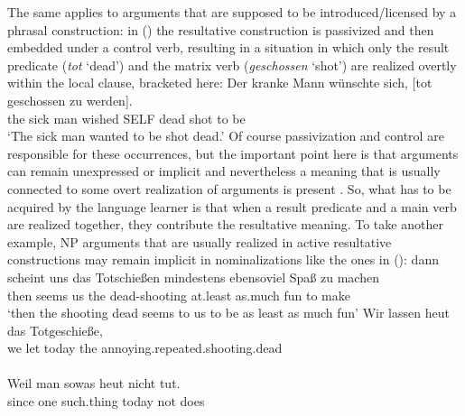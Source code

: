 \begin{exe}
\begin{xlist}[iv.]
\begin{exe}
\begin{xlist}[iv.]
The same applies to arguments that are supposed to be introduced/licensed by a phras\-al construction:
in () the resultative construction is passivized and then embedded under a control
verb, resulting in a situation in which only the result predicate (\emph{tot} `dead') and the matrix verb (\emph{geschossen} `shot') are
realized overtly within the local clause, bracketed here:
\ea
\gll Der kranke Mann wünschte sich, [tot geschossen zu werden].\footnotemark\\
     the sick   man  wished   SELF  \spacebr{}dead shot      to be\\
\glt `The sick man wanted to be shot dead.'
\z
Of course passivization and control are responsible for these occurrences, but the important point
here is that arguments can remain unexpressed or implicit and nevertheless a meaning that is usually
connected to some overt realization of arguments is present \citep[Section~4]{Mueller2007d}. So,
what has to be acquired by the language learner is that when a result predicate and a main verb are
realized together, they contribute the resultative meaning.  
To take another example, NP arguments that are usually realized in active resultative constructions may remain implicit
in nominalizations like the ones in ():
\eal
\label{ex-tot-schiessen}
\ex 
\gll dann scheint uns das Totschießen mindestens ebensoviel Spaß zu machen\footnotemark\\
     then seems   us  the dead-shooting at.least as.much    fun to make\\
\glt `then the shooting dead seems to us to be as least as much fun'
\ex
\gll Wir lassen heut das Totgeschieße,\\                   
we  let    today the annoying.repeated.shooting.dead\\\\
\gll  Weil  man sowas heut nicht tut.\\
      since one such.thing today not does\\\\

\end{xlist}
\end{exe}
\end{xlist}
\end{exe}
